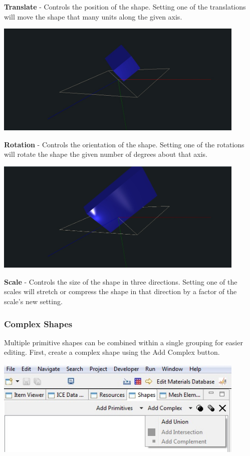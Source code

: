 \textbf{Translate} - Controls the position of the shape. Setting one of the
translations will move the shape that many units along the given axis.

\begin{center}
\includegraphics[width=12cm]{images/GeometryCubeRotate.jpg}
\end{center}

\textbf{Rotation} - Controls the orientation of the shape. Setting one of the
rotations will rotate the shape the given number of degrees about that axis.

\begin{center}
\includegraphics[width=12cm]{images/GeometryCubeScale.jpg}
\end{center}

\textbf{Scale} - Controls the size of the shape in three directions. Setting one
of the scales will stretch or compress the shape in that direction by a factor
of the scale's new setting.

\subsubsection{Complex Shapes}

Multiple primitive shapes can be combined within a single grouping for easier
editing. First, create a complex shape using the Add Complex button. 

\begin{center}
\includegraphics[width=12cm]{images/GeometryAddComplex.jpg}
\end{center}


